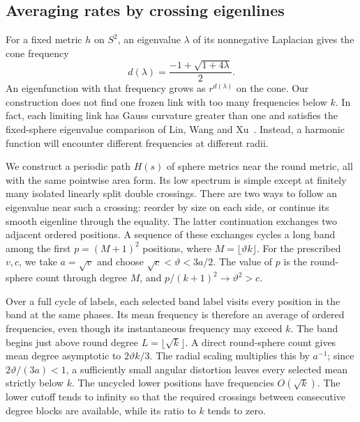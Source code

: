 \subsection*{Averaging rates by crossing eigenlines}

For a fixed metric $h$ on $S^2$, an eigenvalue $\lambda$ of its
nonnegative Laplacian gives the cone frequency
\[
 d(\lambda)=\frac{-1+\sqrt{1+4\lambda}}2.
\]
An eigenfunction with that frequency grows as $r^{d(\lambda)}$ on the cone.
Our construction does not find one frozen link with too many frequencies
below $k$. In fact, each limiting link has Gauss curvature
greater than one and satisfies the fixed-sphere eigenvalue comparison of
Lin, Wang and Xu~\cite[Theorem~1.8]{LinWangXu}. Instead, a harmonic function
will encounter different frequencies at different radii.

We construct a periodic path $H(s)$ of sphere metrics near the round metric,
all with the same pointwise area form. Its low spectrum is simple except at
finitely many isolated linearly split double crossings. There are two ways to
follow an eigenvalue near such a crossing: reorder by size on each side, or
continue its smooth eigenline through the equality. The latter continuation
exchanges two adjacent ordered positions. A sequence of these exchanges
cycles a long band among the first \(p=(M+1)^2\) positions, where
\(M=\lfloor\vartheta k\rfloor\). For the prescribed \(v,c\), we take
\(a=\sqrt v\) and choose \(\sqrt c<\vartheta<3a/2\). The value of \(p\)
is the round-sphere count through degree \(M\), and
\(p/(k+1)^2\to\vartheta^2>c\).

Over a full cycle of labels, each selected band label visits every position
in the band at the same phases. Its mean frequency is therefore an average
of ordered frequencies, even though its instantaneous frequency may exceed
$k$. The band begins just above round degree \(L=\lfloor\sqrt k\rfloor\). A direct
round-sphere count gives mean degree asymptotic to \(2\vartheta k/3\).
The radial scaling multiplies this by \(a^{-1}\); since
\(2\vartheta/(3a)<1\), a sufficiently small angular distortion leaves
every selected mean strictly below \(k\). The uncycled lower positions
have frequencies \(O(\sqrt k)\). The lower cutoff tends to infinity so
that the required crossings between consecutive degree blocks are
available, while its ratio to \(k\) tends to zero.

